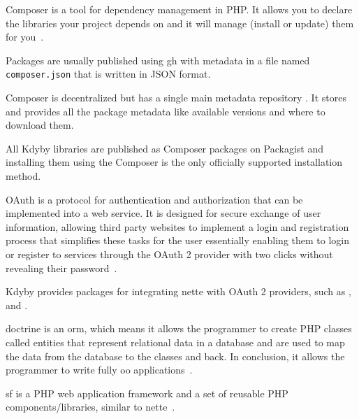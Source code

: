  \label{sec:theory:composer}

Composer is a tool for dependency management in PHP. It allows you to declare the libraries your project depends on and it will manage (install or update) them for you~\cite{composer:docs:intro}.

Packages are usually published using \gls{gh} with metadata in a file named \lstinline{composer.json} that is written in JSON format.

Composer is decentralized but has a single main metadata repository . It stores and provides all the package metadata like available versions and where to download them.

All Kdyby libraries are published as Composer packages on Packagist and installing them using the Composer is the only officially supported installation method.

 \label{sec:theory:oauth2}

OAuth is a protocol for authentication and authorization that can be implemented into a web service. It is designed for secure exchange of user information, allowing third party websites to implement a login and registration process that simplifies these tasks for the user essentially enabling them to login or register to services through the OAuth 2 provider with two clicks without revealing their password~\cite{boyd2012getting}.

Kdyby provides packages for integrating \gls{nette} with OAuth 2 providers, such as ,  and .

 \label{sec:theory:doctrine}

\gls{doctrine} is an \gls{orm}, which means it allows the programmer to create PHP classes called entities that represent relational data in a database and are used to map the data from the database to the classes and back. In conclusion, it allows the programmer to write fully \gls{oo} applications~\cite{fowler2002patterns}.

 \label{sec:theory:symfony}

\gls{sf} is a PHP web application framework and a set of reusable PHP components/libraries, similar to \gls{nette}~\cite{symfony:introduction}.

